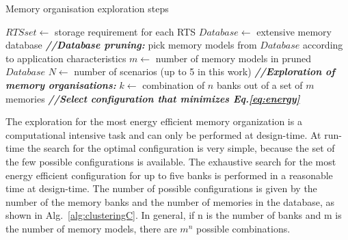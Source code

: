 \begin{algorithm}
\caption{Memory organisation exploration steps}
 \label{alg:clusteringC}
 \begin{algorithmic}[1]
		\STATE $RTSset \gets$ storage requirement for each RTS
		\STATE $Database \gets $ extensive memory database
		\STATE \textbf{\textit{//Database pruning:}} 
		\STATE  pick memory models from $Database$ according to application characteristics
		\ENDFOR	 
		\STATE $m \gets $ number of memory models in pruned $Database$
		\STATE $N \gets $ number of scenarios (up to 5 in this work)
		\STATE \textbf{\textit{//Exploration of memory organisations:}} 
				\STATE $k \gets$ combination of $n$ banks out of a set of $m$ memories  
				\STATE \textbf{\textit{//Select configuration that minimizes Eq.\ref{eq:energy}}} 
					\ENDIF	
				\ENDIF
				\ENDFOR			
			\ENDFOR
 \end{algorithmic}
\end{algorithm}

The exploration for the most energy efficient memory organization is a computational intensive task and can only be performed at design-time. 
At run-time the search for the optimal configuration is very simple, because the set of the few possible configurations is available. 
The exhaustive search for the most energy efficient configuration for up to five banks is performed in a reasonable time at design-time. 
The number of possible configurations is given by the number of the memory banks and the number of memories in the database, as shown in Alg.~\ref{alg:clusteringC}. 
In general, if n is the number of banks and m is the number of memory models, there are $m^{n}$ possible combinations.

